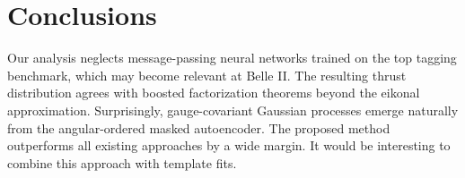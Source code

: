 \section{Conclusions}\label{sec:conclusions}

Our analysis neglects message-passing neural networks trained on the top
tagging benchmark, which may become relevant at Belle II. The resulting
thrust distribution agrees with boosted factorization theorems beyond
the eikonal approximation. Surprisingly, gauge-covariant Gaussian
processes emerge naturally from the angular-ordered masked autoencoder.
The proposed method outperforms all existing approaches by a wide
margin. It would be interesting to combine this approach with template
fits.

